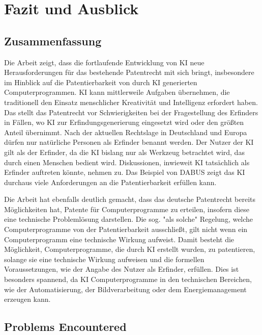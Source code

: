 \chapter{Fazit und Ausblick\label{cha:chapter7}}

\section{Zusammenfassung\label{sec:summary}}

Die Arbeit zeigt, 
dass die fortlaufende Entwicklung von KI neue Herausforderungen 
für das bestehende Patentrecht mit sich bringt, 
insbesondere im Hinblick auf die Patentierbarkeit 
von durch KI generierten Computerprogrammen. 
KI kann mittlerweile Aufgaben übernehmen, die 
traditionell den Einsatz menschlicher Kreativität
und Intelligenz erfordert haben. Das stellt das 
Patentrecht vor Schwierigkeiten bei 
der Fragestellung des Erfinders in Fällen,
wo KI zur Erfindungsgenerierung eingesetzt
wird oder den größten Anteil übernimmt.
Nach der aktuellen Rechtslage 
in Deutschland und Europa dürfen 
nur natürliche Personen als Erfinder benannt werden. 
Der Nutzer der KI gilt als der Erfinder, 
da die KI bislang nur als Werkzeug betrachtet wird, 
das durch einen Menschen bedient wird.
Diskussionen, 
inwieweit KI tatsächlich als Erfinder auftreten könnte,
nehmen zu. 
Das Beispiel von DABUS zeigt das KI durchaus viele
Anforderungen an die Patentierbarkeit erfüllen
kann.

Die Arbeit hat ebenfalls deutlich gemacht, 
dass das deutsche Patentrecht bereits Möglichkeiten hat, 
Patente für Computerprogramme zu erteilen, 
insofern diese eine technische Problemlösung darstellen. 
Die sog. "als solche" Regelung, welche Computerprogramme
von der Patentierbarkeit ausschließt,
gilt nicht wenn ein Computerprogramm eine technische Wirkung 
aufweist.
Damit besteht die Möglichkeit, 
Computerprogramme, die durch KI erstellt wurden, 
zu patentieren, solange sie eine technische Wirkung aufweisen 
und die formellen Voraussetzungen,
wie der Angabe des Nutzer als Erfinder, erfüllen.
Dies ist besonders spannend, da KI Computerprogramme
in den technischen Bereichen, wie 
der Automatisierung, der Bildverarbeitung oder dem Energiemanagement
erzeugen kann.
\section{Problems Encountered\label{sec:problems}}


